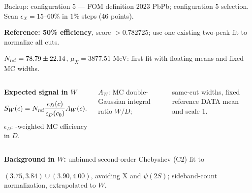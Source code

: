 \begin{frame}[label=p11_20260916]{Backup: configuration 5 --- FOM definition}
  \relax
  {\small 2023 PbPb; configuration 5 selection. Scan $\epsilon_X=15$--$60\%$ in $1\%$ steps (46 points).}\par
  \vspace{0.15em}
  {\centering
  \par}
  \vspace{0.2em}
  {\small
  \textbf{Reference: 50\% efficiency}, score $>0.782725$; use one existing two-peak fit to normalize all cuts.\par
  $N_{\rm ref}=78.79\pm22.14$, $\mu_X=3877.51$ MeV: first fit with floating means and fixed MC widths.\par
  }
  \vspace{0.4em}
  \begin{columns}[T]
    \small
    \textbf{Expected signal in $W$}
    \[
      S_W(c)=N_{\rm ref}\frac{\epsilon_D(c)}{\epsilon_D(c_0)}A_W(c).
    \]
    \small
    $\epsilon_D$: -weighted MC efficiency in $D$.\par
    $A_W$: MC double-Gaussian integral ratio $W/D$;\par
    same-cut widths, fixed reference DATA mean and scale 1.
  \end{columns}
  \vspace{0.3em}
  {\small\textbf{Background in $W$:} unbinned second-order Chebyshev (C2) fit to\par
  $(3.75,3.84)\cup(3.90,4.00)$, avoiding X and $\psi(2S)$; sideband-count normalization, extrapolated to $W$.}\par
\end{frame}

